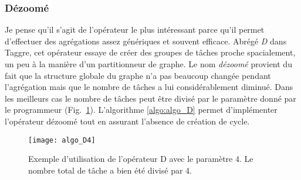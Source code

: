 \subsubsection{Dézoomé}
Je pense qu'il s'agit de l'opérateur le plus intéressant parce qu'il permet d'effectuer des agrégations assez génériques et souvent efficace.
%
Abrégé {\em D} dans Taggre, cet opérateur essaye de créer des groupes de tâches proche spacialement, un peu à la manière d'un partitionneur de graphe.
%
Le nom {\em dézoomé} provient du fait que la structure globale du graphe n'a pas beaucoup changée pendant l'agrégation mais que le nombre de tâches a lui considérablement diminué.
%
Dans les meilleurs cas le nombre de tâches peut être divisé par le paramètre donné par le programmeur (Fig.~\ref{fig:algo_D4}).
%
L'algorithme \ref{algo:algo_D} permet d'implémenter l'opérateur dézoomé tout en assurant l'absence de création de cycle.
\begin{figure}[t!]
  \centering
  \texttt{[image: algo\_D4]}
  \caption{Exemple d'utilisation de l'opérateur D avec le paramètre 4. Le nombre total de tâche a bien été divisé par 4.}
  \label{fig:algo_D4}
\end{figure}
